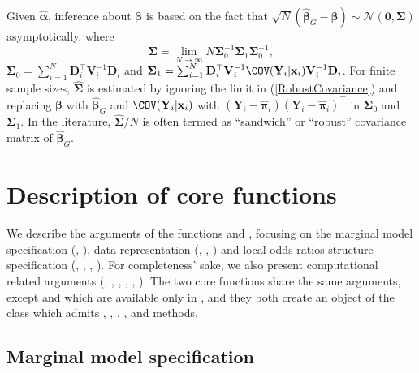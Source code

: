 \documentclass[
]{jss}
\begin{document}
Given \(\widehat{\boldsymbol \alpha}\), inference about
\(\boldsymbol \beta\) is based on the fact that
\(\sqrt{N}(\boldsymbol {\widehat\beta}_G-\boldsymbol \beta)\sim \mathcal{N}(\mathbf 0,\boldsymbol {\Sigma})\)
asymptotically, where \begin{equation}
\boldsymbol {\Sigma}=\lim_{N\to\infty} N \boldsymbol {\Sigma}_0^{-1} \boldsymbol {\Sigma}_1 \boldsymbol {\Sigma}_0^{-1},
\label{RobustCovariance}
\end{equation}
\(\boldsymbol {\Sigma}_0=\sum_{i=1}^N \mathbf{D}_i^{\top} \mathbf {V}^{-1}_{i} \mathbf{D}_i\)
and
\(\boldsymbol {\Sigma}_1=\sum_{i=1}^N \mathbf{D}_i^{\top} \mathbf {V}^{-1}_{i} \COV(\mathbf{Y}_i|\mathbf x_i) \mathbf {V}^{-1}_{i} \mathbf{D}_i\).
For finite sample sizes, \(\widehat{\boldsymbol {\Sigma}}\) is estimated
by ignoring the limit in (\ref{RobustCovariance}) and replacing
\(\boldsymbol \beta\) with \(\boldsymbol {\widehat \beta}_G\) and
\(\COV(\mathbf{Y}_i|\mathbf x_i)\) with
\((\mathbf {Y}_i-\widehat{\boldsymbol{\pi}}_i)(\mathbf {Y}_i-\widehat{\boldsymbol{\pi}}_i)^{\top}\)
in \(\boldsymbol {\Sigma}_0\) and \(\boldsymbol {\Sigma}_1\). In the
literature, \(\widehat{\boldsymbol {\Sigma}}/N\) is often termed as
``sandwich'' or ``robust'' covariance matrix of
\(\boldsymbol {\widehat \beta}_G\).

\hypertarget{Description1}{%
\section{Description of core functions}\label{Description1}}

We describe the arguments of the functions  and
, focusing on the marginal model specification
(, ), data representation (,
, ) and local odds ratios structure
specification (, , ,
). For completeness' sake, we also present
computational related arguments (, ,
, , , ).
The two core functions share the same arguments, except  and
 which are available only in , and they
both create an object of the class  which admits
, , , , 
and  methods.

\hypertarget{marginal-model-specification}{%
\subsection{Marginal model
specification}\label{marginal-model-specification}}
\end{document}
